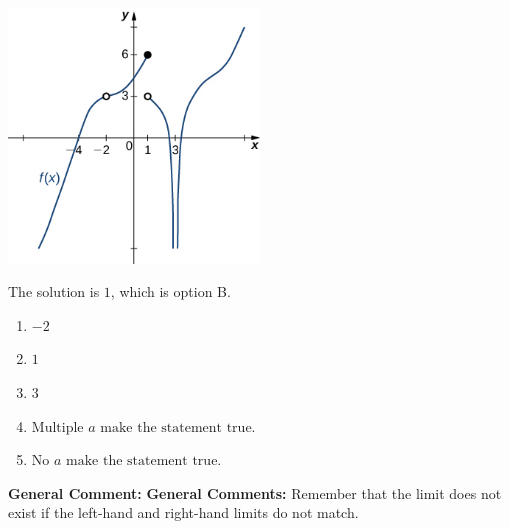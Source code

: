 \documentclass{extbook}[14pt]
\begin{document}
\begin{enumerate}
{\begin{center}
    \includegraphics[width=0.5\textwidth]{../Figures/evaluateLimitGraphicallyA.png}
\end{center}


The solution is \( 1 \), which is option B.\begin{enumerate}[label=\Alph*.]
\item \( -2 \)


\item \( 1 \)


\item \( 3 \)


\item \( \text{Multiple } a \text{ make the statement true}. \)


\item \( \text{No } a \text{ make the statement true}. \)


\end{enumerate}

\textbf{General Comment:} \textbf{General Comments:} Remember that the limit does not exist if the left-hand and right-hand limits do not match.
}
\end{enumerate}
\end{document}

